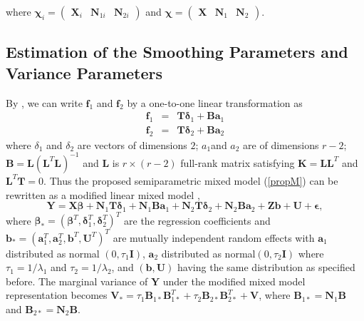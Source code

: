\documentclass[article,lineno]{biometrika}
\begin{document}
where 
$
\boldsymbol \chi_i 
=
\begin{pmatrix}
\boldsymbol X_i & \boldsymbol N_{1i} & \boldsymbol N_{2i}
\end{pmatrix}
$
and
$
\boldsymbol \chi 
=
\begin{pmatrix}
\boldsymbol X & \boldsymbol N_1 & \boldsymbol N_2
\end{pmatrix}.
$

\subsection{Estimation of the Smoothing Parameters and Variance Parameters} \label{estSmoo}

By \cite{Green:1987}, we can write $\boldsymbol f_1$ and $\boldsymbol f_2$ by a one-to-one linear transformation as 
\begin{eqnarray*}
\bm f_1 &=& \bm T \bm \delta_1 + \bm B \bm a_1 \\
\bm f_2 &=& \bm T \bm \delta_2 + \bm B \bm a_2 
\end{eqnarray*}
where $\delta_1$ and  $\delta_2$ are vectors of dimensions $2$;  $a_1$and $a_2$ are of dimensions $r-2$;
$\bm B = \bm L (\bm L^T \bm L)^{-1}$ and $\bm L$ is $r \times (r-2)$ full-rank matrix satisfying $\bm K = \bm L \bm L^T$ and $\bm L^T \bm T = 0$. 
Thus the proposed semiparametric mixed model (\ref{propM}) can be rewritten as a modified linear mixed model \citep {Zhang:1998}, 
\begin{equation} \label{modLME}
\bm Y = \bm X \bm \beta 
+ \bm N_1 \bm T \bm \delta_1 + \bm N_1 \bm B \bm a_1
+ \bm N_2 \bm T \bm \delta_2 + \bm N_2 \bm B \boldsymbol a_2
+ \bm Z \bm b + \bm U + \bm \epsilon,
\end{equation}
where $\bm \beta_* = (\bm \beta^T, \bm \delta_1^T, \bm \delta_2^T)^T$ are the regression coefficients and 
$\boldsymbol b_* = (\bm a_1^T,  \bm a_2^T, \bm b^T, \bm U^T)^T$  are mutually independent random effects with $\bm a_1$ distributed as normal
$(0, \tau_1 \bm I)$,
$\bm a_2$ distributed as normal$(0, \tau_2 \bm I)$ where $\tau_1 = 1/\lambda_1$ and $\tau_2 = 1/\lambda_2$, and $(\bm b, \bm U)$ having the same distribution as specified before. 
The marginal variance of $\boldsymbol Y$ under the modified mixed model representation becomes 
$\boldsymbol V_* = \tau_1 \boldsymbol B_{1*} \boldsymbol B_{1*}^T +  \tau_2 \boldsymbol B_{2*} \boldsymbol B_{2*}^T + \boldsymbol V$, 
where 
$\boldsymbol B_{1*} = \boldsymbol N_1 \boldsymbol B$
and 
$\boldsymbol B_{2*} = \boldsymbol N_2 \boldsymbol B$.
\end{document}
